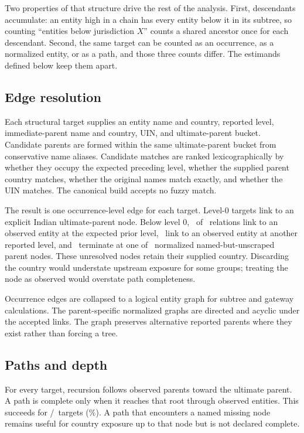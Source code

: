 \documentclass[11pt]{article}
\newcommand{\pct}{\%}
\begin{document}
Two properties of that structure drive the rest of the analysis. First,
descendants accumulate: an entity high in a chain has every entity below it in
its subtree, so counting ``entities below jurisdiction $X$'' counts a shared
ancestor once for each descendant. Second, the same target can be counted as an
occurrence, as a normalized entity, or as a path, and those three counts differ.
The estimands defined below keep them apart.

\subsection{Edge resolution}

Each structural target supplies an entity name and country, reported level,
immediate-parent name and country, UIN, and ultimate-parent bucket. Candidate
parents are formed within the same ultimate-parent bucket from conservative
name aliases. Candidate matches are ranked lexicographically by whether they
occupy the expected preceding level, whether the supplied parent country
matches, whether the original names match exactly, and whether the UIN matches.
The canonical build accepts no fuzzy match.

The result is one occurrence-level edge for each target. Level-0 targets link
to an explicit Indian ultimate-parent node. Below level 0, \ExpectedLinks\ of
\NonrootEdges\ relations link to an observed entity at the expected prior
level, \OtherLevelLinks\ link to an observed entity at another reported level,
and \MissingParentEdges\ terminate at one of \MissingParentNodes\ normalized
named-but-unscraped parent nodes. These unresolved nodes retain their supplied
country. Discarding the country would understate upstream exposure for some
groups; treating the node as observed would overstate path completeness.

Occurrence edges are collapsed to a logical entity graph for subtree and
gateway calculations. The parent-specific normalized graphs are directed and
acyclic under the accepted links. The graph preserves alternative reported
parents where they exist rather than forcing a tree.

\subsection{Paths and depth}

For every target, recursion follows observed parents toward the ultimate
parent. A path is complete only when it reaches that root through observed
entities. This succeeds for \CompletePaths/\Targets\ targets
(\CompletePathPct\pct). A path that encounters a named missing node remains
useful for country exposure up to that node but is not declared complete.
\end{document}
